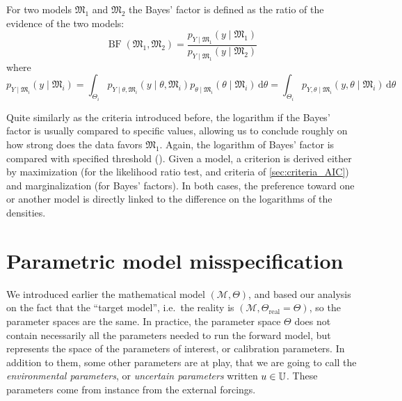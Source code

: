 \documentclass[../../Main_ManuscritThese.tex]{subfiles}
\begin{document}
For two models $\mathfrak{M}_1$ and $\mathfrak{M}_2$ the Bayes' factor is defined as the ratio of the evidence of the two models:
\begin{equation}
  \label{eq:bayes_factor}
  \mathop{\mathrm{BF}}(\mathfrak{M}_1,\mathfrak{M}_2)= \frac{p_{Y\mid \mathfrak{M}_1}(y \mid \mathfrak{M}_1) }{p_{Y\mid \mathfrak{M}_1}(y \mid \mathfrak{M}_2)}
\end{equation}
where
\begin{equation}
  p_{Y \mid \mathfrak{M}_i}(y \mid \mathfrak{M}_i)= \int_{\Theta_i} p_{Y \mid \theta,\mathfrak{M}_i}(y \mid \theta, \mathfrak{M}_i)p_{\theta \mid \mathfrak{M}_i}(\theta \mid \mathfrak{M}_i) \,\mathrm{d}\theta = \int_{\Theta_i} p_{Y, \theta \mid \mathfrak{M}_i}(y, \theta \mid \mathfrak{M}_i) \,\mathrm{d}\theta
\end{equation}

Quite similarly as the criteria introduced before, the logarithm if the Bayes' factor is usually compared to specific values, allowing us to conclude roughly on how strong does the data favors $\mathfrak{M}_1$. Again, the logarithm of Bayes' factor is compared with specified threshold (\cite{kass_bayes_1995,burnham_multimodel_2004}).
Given a model, a criterion is derived either by maximization (for the likelihood ratio test, and criteria of \cref{sec:criteria_AIC}) and marginalization (for Bayes' factors).
In both cases, the preference toward one or another model is directly linked to the difference on the logarithms of the densities.

\section{Parametric model misspecification}
\label{sec:model_misspecification}
We introduced earlier the mathematical model $(\mathcal{M},\Theta)$, and based our analysis on the fact that the ``target model'', i.e.\ the reality is $(\mathscr{M},\Theta_{\mathrm{real}} = \Theta)$, so the parameter spaces are the same.
In practice, the parameter space $\Theta$ does not contain necessarily all the parameters needed to run the forward model, but represents the space of the parameters of interest, or calibration parameters. In addition to them, some other parameters are at play, that we are going to call the \emph{environmental parameters}, or \emph{uncertain parameters} written $u\in \mathbb{U}$. These parameters come from instance from the external forcings. 
\end{document}
